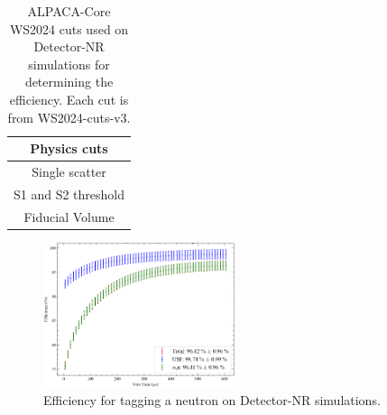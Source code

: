 \begin{table}
	\centering
	\begin{tabular}{|c|}
    \hline
		Physics cuts        \\
		\hline
		Single scatter      \\
		S1 and S2 threshold \\
		Fiducial Volume\\
        \hline
	\end{tabular}
	\caption{ALPACA-Core WS2024 cuts used on Detector-NR simulations for determining the efficiency. Each cut is from WS2024-cuts-v3.}
	\label{tab:detector_nr_simulation_efficiency_cuts}
\end{table}

\begin{figure}
	\centering
	\includegraphics[width=0.5\textwidth]{figures/VetoEfficiency/det_nr_efficiency.png}
	\caption{Efficiency for tagging a neutron on Detector-NR simulations.}
	\label{fig:VetoEff/detector_nr_efficiency}
\end{figure}

\clearpage
